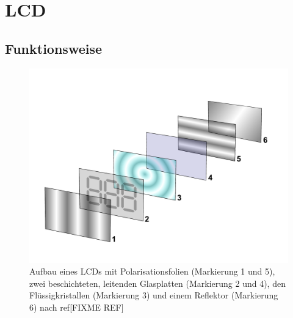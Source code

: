 \section{LCD}
\subsection{Funktionsweise}

\begin{figure}[t]
  \centering
  \includegraphics[width=\linewidth, keepaspectratio]{Bilder/LCD_layers}
  \caption{Aufbau eines LCDs mit Polarisationsfolien (Markierung 1 und 5), zwei beschichteten, leitenden Glasplatten (Markierung 2 und 4), den Flüssigkristallen (Markierung 3) und einem Reflektor (Markierung 6) nach ref[FIXME REF]}
  \label{lcdaufbau}
\end{figure}

